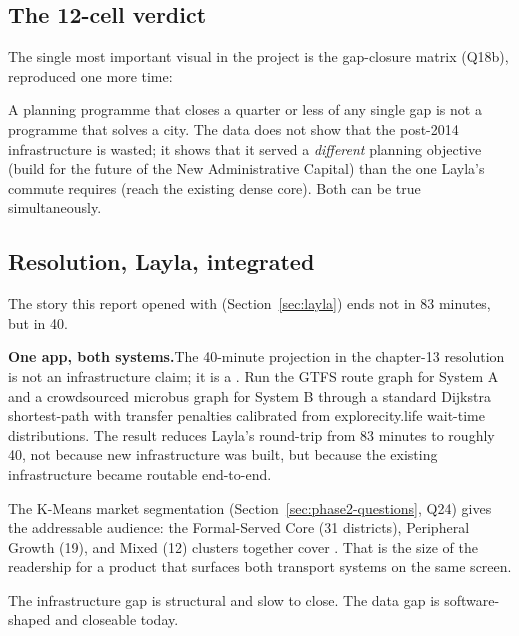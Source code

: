 \subsection{The 12-cell verdict}

The single most important visual in the project is the gap-closure
matrix (Q18b), reproduced one more time:


A planning programme that closes a quarter or less of any single gap
is not a programme that solves a city. The data does not show that
the post-2014 infrastructure is wasted; it shows that it served a
\emph{different} planning objective (build for the future of the New
Administrative Capital) than the one Layla's commute requires
(reach the existing dense core). Both can be true simultaneously.

\subsection{Resolution, Layla, integrated}

The story this report opened with (Section~\ref{sec:layla}) ends not
in 83 minutes, but in 40.

\begin{callout}
\textbf{\color{plotblue}One app, both systems.}\quad The 40-minute
projection in the chapter-13 resolution is not an infrastructure
claim; it is a . Run the GTFS route graph for
System A and a crowdsourced microbus graph for System B through a
standard Dijkstra shortest-path with transfer penalties calibrated
from explorecity.life wait-time distributions. The result reduces
Layla's round-trip from 83 minutes to roughly 40, not because new
infrastructure was built, but because the existing infrastructure
became routable end-to-end.

The K-Means market segmentation
(Section~\ref{sec:phase2-questions}, Q24) gives the addressable
audience: the Formal-Served Core (31 districts), Peripheral Growth
(19), and Mixed (12) clusters together cover . That is the size of the readership for a
product that surfaces both transport systems on the same screen.

The infrastructure gap is structural and slow to close. The data gap
is software-shaped and closeable today.
\end{callout}


